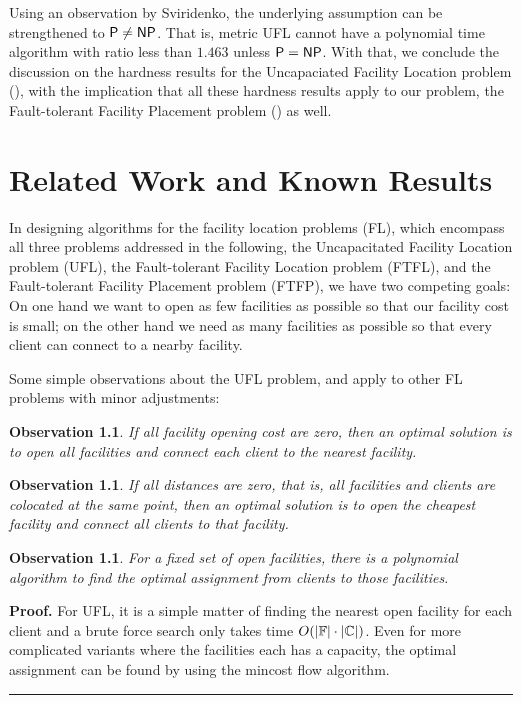 \documentclass[oneside,final]{ucr}
\newtheorem{observation}[theorem]{Observation}
\newenvironment{proof}[1][Proof]{\textbf{#1.} }{\ \rule{0.5em}{0.5em}}
\begin{document}
Using an observation by Sviridenko, the underlying
assumption can be strengthened to ${\mbox{\sf P}} \neq {\mbox{\sf NP}}$. That is,
metric UFL cannot have a polynomial time algorithm with
ratio less than $1.463$ unless ${\mbox{\sf P}} = {\mbox{\sf NP}}$. With that, we
conclude the discussion on the hardness results for the
Uncapaciated Facility Location problem ({\UFL}), with the
implication that all these hardness results apply to our
problem, the Fault-tolerant Facility Placement problem
(\FTFP) as well.

\chapter{Related Work and Known Results} \label{ch: related_work}

In designing algorithms for the facility location problems
(FL), which encompass all three problems addressed in the
following, the Uncapacitated Facility Location problem
(UFL), the Fault-tolerant Facility Location problem (FTFL),
and the Fault-tolerant Facility Placement problem (FTFP), we
have two competing goals: On one hand we want to open as few
facilities as possible so that our facility cost is small;
on the other hand we need as many facilities as possible so
that every client can connect to a nearby facility.

Some simple observations about the UFL problem, and apply to
other FL problems with minor adjustments:
\begin{observation}
  If all facility opening cost are zero, then an optimal
  solution is to open all facilities and connect each client
  to the nearest facility.
\end{observation}

\begin{observation}
  If all distances are zero, that is, all facilities and
  clients are colocated at the same point, then an optimal
  solution is to open the cheapest facility and connect all
  clients to that facility.
\end{observation}

\begin{observation}
  For a fixed set of open facilities, there is a polynomial
  algorithm to find the optimal assignment from clients to
  those facilities.
\end{observation}
\begin{proof}
  For UFL, it is a simple matter of finding the nearest open
  facility for each client and a brute force search only
  takes time $O(|\mathbb{F}|\cdot |\mathbb{C}|)$. Even for
  more complicated variants where the facilities each has a
  capacity, the optimal assignment can be found by using the
  mincost flow algorithm.
\end{proof}
\end{document}
